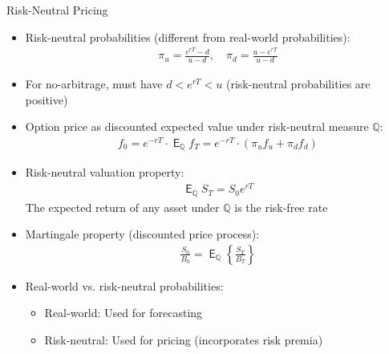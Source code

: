 \documentclass[10pt]{beamer}
\DeclareMathOperator\expc{\mathsf{E}}
\begin{document}
\begin{frame}{Risk-Neutral Pricing}
  \begin{itemize}[<+->]
    \item Risk-neutral probabilities (different from real-world probabilities):
      \begin{align*}
        \pi_u = \tfrac{e^{rT} - d}{u - d}, \quad \pi_d = \tfrac{u - e^{rT}}{u - d}
      \end{align*}
      
    \item For no-arbitrage, must have $d < e^{rT} < u$ (risk-neutral probabilities are positive)
    
    \item Option price as discounted expected value under risk-neutral measure $\mathbb{Q}$:
      \begin{align*}
        f_0 = e^{-rT} \cdot \expc_{\mathbb{Q}}{f_T} = e^{-rT} \cdot (\pi_u f_u + \pi_d f_d)
      \end{align*}
      
    \item Risk-neutral valuation property:
      \begin{align*}
        \expc_{\mathbb{Q}}{S_T} = S_0e^{rT}
      \end{align*}
      The expected return of any asset under $\mathbb{Q}$ is the risk-free rate
      
    \item Martingale property (discounted price process):
      \begin{align*}
        \tfrac{S_0}{B_0} = \expc_{\mathbb{Q}}\left\{\tfrac{S_T}{B_T}\right\}
      \end{align*}
      
    \item Real-world vs. risk-neutral probabilities:
      \begin{itemize}
        \item Real-world: Used for forecasting
        \item Risk-neutral: Used for pricing (incorporates risk premia)
      \end{itemize}
  \end{itemize}
\end{frame}
\end{document}
